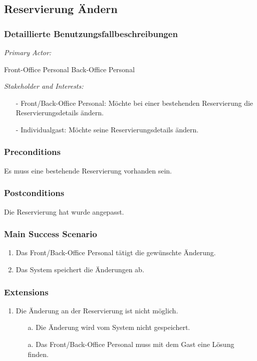 \documentclass[./detailed_overview_usecases.tex]{subfiles}
\begin{document}
    \subsection{Reservierung Ändern}
    \subsubsection{Detaillierte Benutzungsfallbeschreibungen}
    \textit{Primary Actor:}
    \begin{enumerate}
        Front-Office Personal
        Back-Office Personal
    \end{enumerate}
    \textit{Stakeholder and Interests:}
    \begin{itemize}
        \item[-] Front/Back-Office Personal: Möchte bei einer bestehenden Reservierung die Reservierungsdetails ändern.
        \item[-] Individualgast: Möchte seine Reservierungsdetails ändern.
    \end{itemize}

    \subsubsection*{Preconditions}
    Es muss eine bestehende Reservierung vorhanden sein.

    \subsubsection*{Postconditions}
    Die Reservierung hat wurde angepasst.

    \subsubsection*{Main Success Scenario}
    \begin{enumerate}
        \item Das Front/Back-Office Personal tätigt die gewünschte Änderung.
        \item Das System speichert die Änderungen ab.
    \end{enumerate}

    \subsubsection*{Extensions}
    \begin{enumerate}
        \item Die Änderung an der Reservierung ist nicht möglich.
        \begin{itemize}
            \item[a.] Die Änderung wird vom System nicht gespeichert.
            \item[a.] Das Front/Back-Office Personal muss mit dem Gast eine Lösung finden.
        \end{itemize}
    \end{enumerate}
\end{document}
